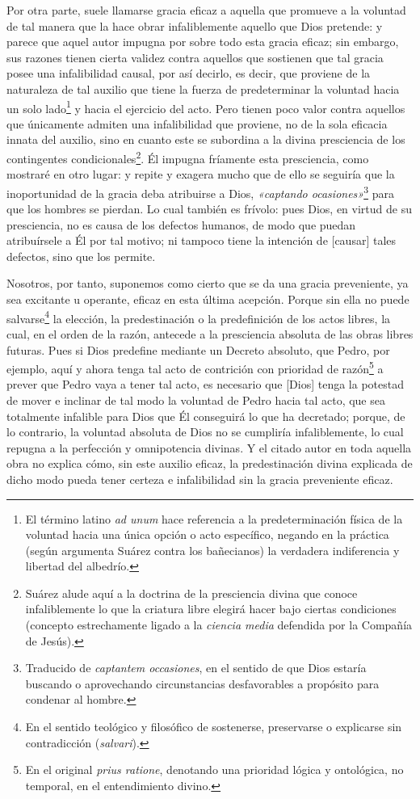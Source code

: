 \documentclass{article}
\begin{document}
Por otra parte, suele llamarse gracia eficaz a aquella que promueve a la voluntad de tal
manera que la hace obrar infaliblemente aquello que Dios pretende: y parece que aquel
autor impugna por sobre todo esta gracia eficaz; sin embargo, sus razones tienen cierta
validez contra aquellos que sostienen que tal gracia posee una infalibilidad causal, por
así decirlo, es decir, que proviene de la naturaleza de tal auxilio que tiene la fuerza
de predeterminar la voluntad hacia un solo lado\footnote{El término latino \textit{ad
unum} hace referencia a la predeterminación física de la voluntad hacia una única opción
o acto específico, negando en la práctica (según argumenta Suárez contra los bañecianos)
la verdadera indiferencia y libertad del albedrío.} y hacia el ejercicio del acto. Pero
tienen poco valor contra aquellos que únicamente admiten una infalibilidad que proviene,
no de la sola eficacia innata del auxilio, sino en cuanto este se subordina a la divina
presciencia de los contingentes condicionales\footnote{Suárez alude aquí a la doctrina
de la presciencia divina que conoce infaliblemente lo que la criatura libre elegirá
hacer bajo ciertas condiciones (concepto estrechamente ligado a la \textit{ciencia
media} defendida por la Compañía de Jesús).}. Él impugna fríamente esta presciencia,
como mostraré en otro lugar: y repite y exagera mucho que de ello se seguiría que la
inoportunidad de la gracia deba atribuirse a Dios, \textit{«captando
ocasiones»}\footnote{Traducido de \textit{captantem occasiones}, en el sentido de que
Dios estaría buscando o aprovechando circunstancias desfavorables a propósito para
condenar al hombre.} para que los hombres se pierdan. Lo cual también es frívolo: pues
Dios, en virtud de su presciencia, no es causa de los defectos humanos, de modo que
puedan atribuírsele a Él por tal motivo; ni tampoco tiene la intención de [causar] tales
defectos, sino que los permite.

Nosotros, por tanto, suponemos como cierto que se da una gracia preveniente, ya sea
excitante u operante, eficaz en esta última acepción. Porque sin ella no puede
salvarse\footnote{En el sentido teológico y filosófico de sostenerse, preservarse o
explicarse sin contradicción (\textit{salvari}).} la elección, la predestinación o la
predefinición de los actos libres, la cual, en el orden de la razón, antecede a la
presciencia absoluta de las obras libres futuras. Pues si Dios predefine mediante un
Decreto absoluto, que Pedro, por ejemplo, aquí y ahora tenga tal acto de contrición con
prioridad de razón\footnote{En el original \textit{prius ratione}, denotando una
prioridad lógica y ontológica, no temporal, en el entendimiento divino.} a prever que
Pedro vaya a tener tal acto, es necesario que [Dios] tenga la potestad de mover e
inclinar de tal modo la voluntad de Pedro hacia tal acto, que sea totalmente infalible
para Dios que Él conseguirá lo que ha decretado; porque, de lo contrario, la voluntad
absoluta de Dios no se cumpliría infaliblemente, lo cual repugna a la perfección y
omnipotencia divinas. Y el citado autor en toda aquella obra no explica cómo, sin este
auxilio eficaz, la predestinación divina explicada de dicho modo pueda tener certeza e
infalibilidad sin la gracia preveniente eficaz.
\end{document}
